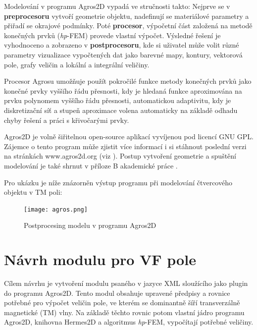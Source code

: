 \documentclass[12pt,a4paper,oneside]{article}
\numberwithin{equation}{section} %
\numberwithin{figure}{section} %
\numberwithin{table}{section} %
\begin{document}
Modelování v programu Agros2D vypadá ve stručnosti takto: Nejprve se v \textbf{preprocesoru} vytvoří geometrie objektu, nadefinují se materiálové parametry a přiřadí se okrajové podmínky. Poté \textbf{procesor}, výpočetní část založená na metodě konečných prvků (\textit{hp}-FEM) provede vlastní výpočet. Výsledné řešení je vyhodnoceno a zobrazeno v \textbf{postprocesoru}, kde si uživatel může volit různé parametry vizualizace vypočtených dat jako barevné mapy, kontury, vektorová pole, grafy veličin a lokální a integrální veličiny. 

Procesor Agrosu umožňuje použít pokročilé funkce metody konečných prvků jako konečné prvky vyššího řádu přesnosti, kdy je hledaná funkce aproximována na prvku polynomem vyššího řádu přesnosti, automatickou adaptivitu, kdy je diskretizační síť a stupeň aproximace volena automaticky na základě odhadu chyby řešení a práci s křivočarými prvky.

Agros2D je volně šiřitelnou open-source aplikací vyvíjenou pod licencí GNU GPL. Zájemce o tento program může zjistit více informací i si stáhnout poslední verzi na stránkách www.agros2d.org (viz \cite{Agros}). Postup vytvoření geometrie a spuštění modelování je také shrnut v příloze B akademické práce \cite{Koudela}.

Pro ukázku je níže znázorněn výstup programu při modelování čtvercového objektu v TM poli:
\begin{figure}[h] %
\begin{center}
\texttt{[image: agros.png]} %
\caption{Postprocesing modelu v programu Agros2D} %
\end{center}
\end{figure}



\newpage
\section{Návrh modulu pro VF pole}
Cílem návrhu je vytvoření modulu psaného v jazyce XML sloužícího jako plugin do programu Agros2D. Tento modul obsahuje upravené předpisy a rovnice potřebné pro výpočet veličin pole, ve kterém se dominantně šíří transverzálně magnetické (TM) vlny. Na základě těchto rovnic potom vlastní jádro programu Agros2D, knihovna Hermes2D a algoritmus \textit{hp}-FEM, vypočítají potřebné veličiny.
\end{document}
